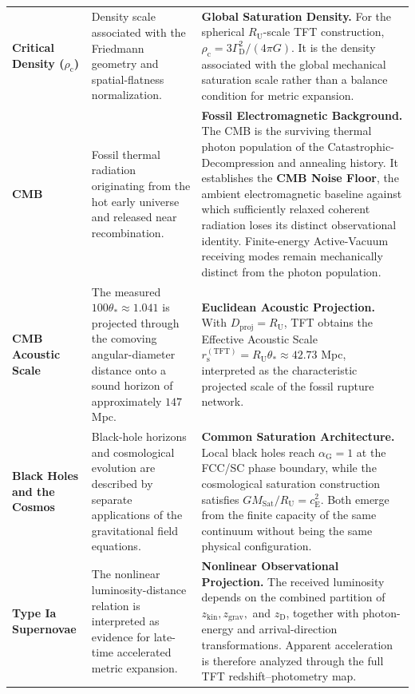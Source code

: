 \begin{longtable}{@{} p{3.0cm} p{5.5cm} p{6.5cm} @{}}
\textbf{Critical Density ($\rho_{\mathrm c}$)} & Density scale associated with the Friedmann geometry and spatial-flatness normalization. & \textbf{Global Saturation Density.} For the spherical $R_{\mathrm U}$-scale TFT construction, $\rho_{\mathrm c} = 3\Gamma_{\mathrm D}^2/(4\pi G)$. It is the density associated with the global mechanical saturation scale rather than a balance condition for metric expansion. \\

\textbf{CMB} & Fossil thermal radiation originating from the hot early universe and released near recombination. & \textbf{Fossil Electromagnetic Background.} The CMB is the surviving thermal photon population of the Catastrophic-Decompression and annealing history. It establishes the \textbf{CMB Noise Floor}, the ambient electromagnetic baseline against which sufficiently relaxed coherent radiation loses its distinct observational identity. Finite-energy Active-Vacuum receiving modes remain mechanically distinct from the photon population. \\

\textbf{CMB Acoustic Scale} & The measured $100\theta_*\approx1.041$ is projected through the comoving angular-diameter distance onto a sound horizon of approximately $147$ Mpc. & \textbf{Euclidean Acoustic Projection.} With $D_{\mathrm{proj}}=R_{\mathrm U}$, TFT obtains the Effective Acoustic Scale $r_{\mathrm s}^{(\mathrm{TFT})} = R_{\mathrm U}\theta_* \approx 42.73$ Mpc, interpreted as the characteristic projected scale of the fossil rupture network. \\

\textbf{Black Holes and the Cosmos} & Black-hole horizons and cosmological evolution are described by separate applications of the gravitational field equations. & \textbf{Common Saturation Architecture.} Local black holes reach $\alpha_{\mathrm G}=1$ at the FCC/SC phase boundary, while the cosmological saturation construction satisfies $GM_{\mathrm{Sat}}/R_{\mathrm U}=c_{\mathrm E}^2$. Both emerge from the finite capacity of the same continuum without being the same physical configuration. \\

\textbf{Type Ia Supernovae} & The nonlinear luminosity-distance relation is interpreted as evidence for late-time accelerated metric expansion. & \textbf{Nonlinear Observational Projection.} The received luminosity depends on the combined partition of $z_{\mathrm{kin}}, z_{\mathrm{grav}},$ and $z_{\mathrm D}$, together with photon-energy and arrival-direction transformations. Apparent acceleration is therefore analyzed through the full TFT redshift--photometry map. \\


\end{longtable}
